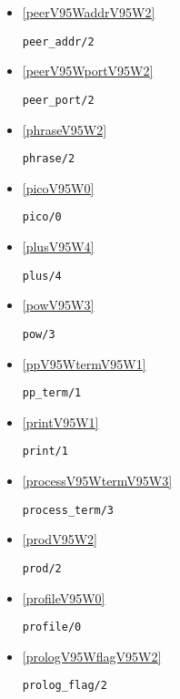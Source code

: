 \begin{itemize}
\item \ref{peerV95WaddrV95W2} 
\begin{verbatim}
peer_addr/2
\end{verbatim}

\item \ref{peerV95WportV95W2} 
\begin{verbatim}
peer_port/2
\end{verbatim}

\item \ref{phraseV95W2} 
\begin{verbatim}
phrase/2
\end{verbatim}

\item \ref{picoV95W0} 
\begin{verbatim}
pico/0
\end{verbatim}

\item \ref{plusV95W4} 
\begin{verbatim}
plus/4
\end{verbatim}

\item \ref{powV95W3} 
\begin{verbatim}
pow/3
\end{verbatim}

\item \ref{ppV95WtermV95W1} 
\begin{verbatim}
pp_term/1
\end{verbatim}

\item \ref{printV95W1} 
\begin{verbatim}
print/1
\end{verbatim}

\item \ref{processV95WtermV95W3} 
\begin{verbatim}
process_term/3
\end{verbatim}

\item \ref{prodV95W2} 
\begin{verbatim}
prod/2
\end{verbatim}

\item \ref{profileV95W0} 
\begin{verbatim}
profile/0
\end{verbatim}

\item \ref{prologV95WflagV95W2} 
\begin{verbatim}
prolog_flag/2
\end{verbatim}


\end{itemize}
